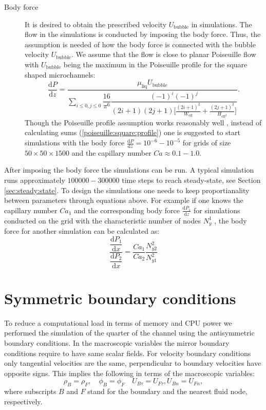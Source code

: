 \documentclass{article}
\begin{document}
\begin{description}
\item[Body force] 
It is desired to obtain the prescribed velocity $U_{\mathrm{bubble}}$ in simulations. The
flow in the simulations is conducted by imposing the body force. Thus, the assumption is needed of
how the body force is connected with the bubble velocity $U_{\mathrm{bubble}}$. We assume that the
flow is close to planar Poiseuille flow with $U_{\mathrm{bubble}}$ being the maximum in the
Poiseuille profile for the square shaped microchannels:
\begin{equation}
\label{poiseuille:square:profile}
\dfrac{\mathrm{d}P}{\mathrm{d}z}=\frac{\mu_{\mathrm{liq}} U_{\mathrm{bubble}}}{\sum_{i\leq 0,j\leq
0}{\dfrac{16}{\pi^6} \dfrac{(-1)^i (-1)^j}{(2 i+1)(2 j+1)\bigl[\frac{(2 i
+1)^2}{W_{\mathrm{eff}}}+\frac{(2 j+1)^2}{H_{\mathrm{eff}^2}}\bigr]}}}.
\end{equation}
Though the Poiseuille profile assumption works reasonably well \cite{kuzmin-binary2d}, instead of
calculating sums (\ref{poiseuille:square:profile})  one is suggested to start simulations with the
body force $\frac{\mathrm{d}P}{\mathrm{d}z}=10^{-6}-10^{-5}$ for grids of size $50\times 50 \times
1500$ and the capillary number $Ca\approx0.1-1.0$.  
\end{description}
After imposing the body force the simulations can be run. A typical simulation runs approximately
$100000-300000$ time steps to reach steady-state, see Section \ref{sec:steady:state}. To design the
simulations one needs to keep proportianality between parameters through equations above. For
example if one knows the capillary number $Ca_1$ and the corresponding body force
$\frac{\mathrm{d}P_1}{\mathrm{d}z}$ for simulations conducted on the grid with the characteristic
number of nodes $N_y^1$ , the body force for another simulation can be calculated as:
\begin{equation}
\dfrac{\dfrac{\mathrm{d}P_1}{\mathrm{d}x}}{\dfrac{\mathrm{d}P_2}{\mathrm{d}x}}=\frac{Ca_1}{Ca_2}
\frac{N_{
y2}^2 }{N_{y1}^2}
\end{equation}

\section{Symmetric boundary conditions}
\label{append:sym}
To reduce a computational load in terms of memory and CPU power we performed the simulation of the
quarter of the channel using the antisymmetric boundary conditions. In the macroscopic variables the
mirror boundary conditions require to have same scalar fields. For velocity boundary conditions only
tangential velocities are the same, perpendicular to boundary velocities have opposite
signs. This implies the following in terms of the
macroscopic variables:
\begin{equation}
\rho_B = \rho_F, \quad \phi_B = \phi_F \quad U_{B\tau}=U_{F\tau}, U_{B n}=U_{F n}, 
\end{equation}
where subscripts $B$ and $F$ stand for the boundary and the nearest fluid node, respectively. 
\end{document}
